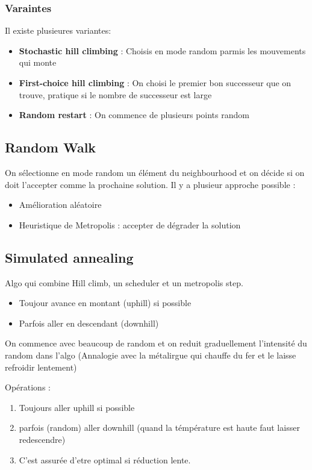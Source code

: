 	\subsubsection{Varaintes}
		Il existe plusieures variantes:
		\begin{itemize}
			\item \textbf{Stochastic hill climbing} : Choisis en mode random parmis les mouvements qui monte
			\item \textbf{First-choice hill climbing} : On choisi le premier bon successeur que on trouve, pratique si le nombre de successeur est large
			\item \textbf{Random restart} : On commence de plusieurs points random
		\end{itemize}
	
	\subsection{Random Walk}
		On sélectionne en mode random un élément du neighbourhood et on décide si on doit l'accepter comme la prochaine solution. Il y a plusieur approche possible :
		\begin{itemize}
			\item Amélioration aléatoire
			\item Heuristique de Metropolis : accepter de dégrader la solution
		\end{itemize}
		
	\subsection{Simulated annealing}
		Algo qui combine Hill climb, un scheduler et un metropolis step.
		\begin{itemize}
			\item Toujour avance en montant (uphill) si possible
			\item Parfois aller en descendant (downhill) 
		\end{itemize}
		
		On commence avec beaucoup de random et on reduit graduellement l'intensité du random dans l'algo (Annalogie avec la métalirgue qui chauffe du fer et le laisse refroidir lentement)
		
		Opérations :
		\begin{enumerate}
			\item Toujours aller uphill si possible
			\item parfois (random) aller downhill (quand la témpérature est haute faut laisser redescendre)
			\item C'est assurée d'etre optimal si réduction lente.
		\end{enumerate}
				
